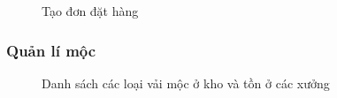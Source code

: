 \begin{figure}[H]
    \begin{center}
        \caption{Tạo đơn đặt hàng}
        \label{mockup_create_order}
    \end{center}
\end{figure}

\subsubsection{Quản lí mộc}

\begin{figure}[H]
    \begin{center}
        \caption{Danh sách các loại vải mộc ở kho và tồn ở các xưởng}
        \label{mockup_raw}
    \end{center}
\end{figure}


